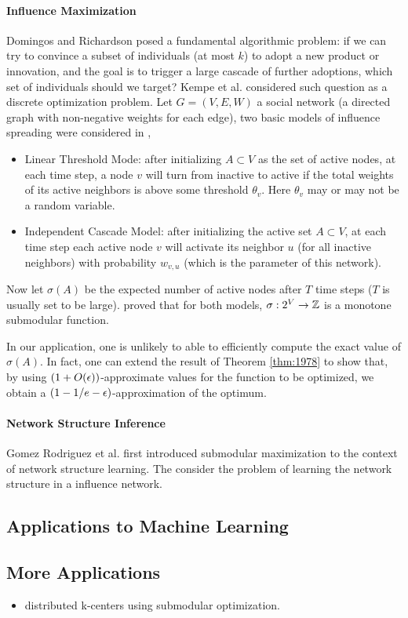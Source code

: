 \paragraph{Influence Maximization}
Domingos and Richardson \cite{DR01,RD02} posed a fundamental algorithmic problem: if we can try to convince a subset of individuals (at most $k$) to adopt a new product or innovation, and the goal is to trigger a large cascade of further adoptions, which set of individuals should we target? 
Kempe et al. \cite{KKT03} considered such question as a discrete optimization problem. Let $G = (V, E, W)$ a social network (a directed graph with non-negative weights for each edge), two basic models of influence spreading were considered in \cite{KKT03},
\begin{itemize}
\item Linear Threshold Mode: after initializing $A \subset V$ as the set of active nodes, at each time step, a node $v$ will turn from inactive to active if the total weights of its active neighbors is above some threshold $\theta_v$. Here $\theta_v$ may or may not be a random variable.
\item Independent Cascade Model:  after initializing the active set $A \subset V$, at each time step each active node $v$ will activate its neighbor $u$ (for all inactive neighbors) with probability $w_{v,u}$ (which is the parameter of this network).
\end{itemize}

Now let $\sigma(A)$ be the expected number of active nodes after $T$ time steps ($T$ is usually set to be large). \cite{KKT03} proved that for both models, $\sigma: 2^V \rightarrow \mathbb{Z}$ is a monotone submodular function.


In our application, one is unlikely to able to efficiently compute the exact value of $\sigma(A)$. In fact, one can extend the result of Theorem \ref{thm:1978} to show that, by using  $(1 + O(\epsilon))$-approximate values for the function to be optimized, we obtain a $(1 - 1/e - \epsilon)$-approximation of the optimum.


\paragraph{Network Structure Inference}
Gomez Rodriguez et al. \cite{GLK10} first introduced submodular maximization to the context of network structure learning. The consider the problem of learning the network structure in a influence network.


\subsection{Applications to Machine Learning}

\subsection{More Applications}



\begin{itemize}
\item \cite{MKC+15} distributed k-centers using submodular optimization.
\end{itemize}


